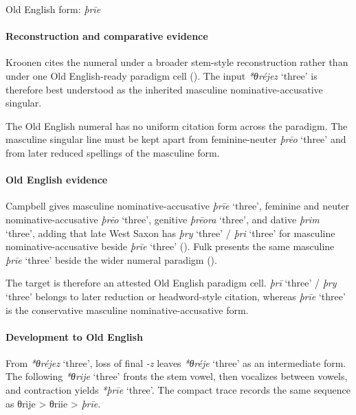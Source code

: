 \documentclass[
  british,
  a4paper,
]{article}
\providecommand{\Recon}[1]{\emph{*#1}}
\begin{document}
Old English form: \emph{þrīe}

\paragraph{Reconstruction and comparative
evidence}\label{reconstruction-and-comparative-evidence-80}

Kroonen cites the numeral under a broader stem-style reconstruction
rather than under one Old English-ready paradigm cell
(). The input
\Recon{θréjez} `three' is therefore best understood as the inherited
masculine nominative-accusative singular.

The Old English numeral has no uniform citation form across the
paradigm. The masculine singular line must be kept apart from
feminine-neuter \emph{þrēo} `three' and from later reduced spellings of
the masculine form.

\paragraph{Old English evidence}\label{old-english-evidence-80}

Campbell gives masculine nominative-accusative {\emph{þrīe}} `three',
feminine and neuter nominative-accusative {\emph{þrēo}} `three',
genitive {\emph{þrēora}} `three', and dative {\emph{þrim}} `three',
adding that late West Saxon has \emph{þry} `three' / \emph{þri} `three'
for masculine nominative-accusative beside {\emph{þrīe}} `three'
(). Fulk presents
the same masculine \emph{þrīe} `three' beside the wider numeral paradigm
().

The target is therefore an attested Old English paradigm cell.
\emph{þrī} `three' / \emph{þry} `three' belongs to later reduction or
headword-style citation, whereas {\emph{þrīe}} `three' is the
conservative masculine nominative-accusative form.

\paragraph{Development to Old
English}\label{development-to-old-english-80}

From \Recon{θréjez} `three', loss of final \emph{-z} leaves
\Recon{θréje} `three' as an intermediate form. The following
\Recon{θrije} `three' fronts the stem vowel, then vocalizes between
vowels, and contraction yields \Recon{þrīe} `three'. The compact trace
records the same sequence as θrije \textgreater{} θriie \textgreater{}
\emph{þrīe}.
\end{document}
